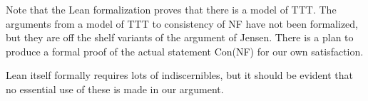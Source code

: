 \documentclass{slides}
\begin{document}
\begin{slide}

Note that the Lean formalization proves that there is a model of TTT.  The arguments from a model of TTT to consistency of NF have not been formalized, but they are off the shelf variants of the argument of Jensen.  There is a plan to produce a formal proof of the actual statement Con(NF) for our own satisfaction.

Lean itself formally requires lots of indiscernibles, but it should be evident that no essential use of these is made in our argument.


\end{slide}
\end{document}
